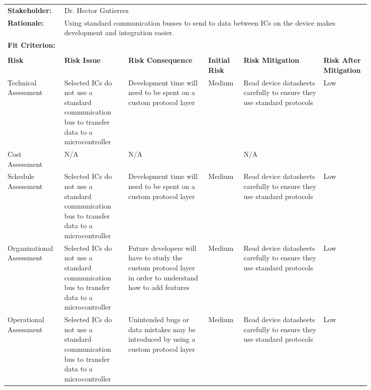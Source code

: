 \begin{landscape}
{\begin{longtable}{| p{0.12\linewidth} | p{0.16\linewidth} |  p{0.20\linewidth} | p{0.08\linewidth} | p{0.20\linewidth} | p{0.08\linewidth} |}
	\hline
	\rowcolor[gray]{0.8}
	\multicolumn{6}{|c|}{ } \\
	\hline
	\textbf{Stakeholder:} & \multicolumn{5}{|l|}{Dr. Hector Gutierrez} \\
	\hline
	\textbf{Rationale:} & \multicolumn{5}{|p{0.8\linewidth}|}{Using standard communication busses to send to data between ICs on the device makes development and integration easier.} \\
	\hline
	\textbf{Fit Criterion:} & \multicolumn{5}{|p{0.8\linewidth}|}{} \\
	\hline
	\rowcolor[gray]{0.8}
	\multicolumn{6}{|c|}{ } \\
	\hline
	\textbf{Risk} & \textbf{Risk Issue} & \textbf{Risk Consequence} & \textbf{Initial Risk} & \textbf{Risk Mitigation} & \textbf{Risk \newline After \newline Mitigation} \\
	\hline
	Technical \newline Assessment & Selected ICs do not use a standard communication bus to transfer data to a microcontroller & Development time will need to be spent on a custom protocol layer & \cellcolor{yellow} Medium & Read device datasheets carefully to ensure they use standard protocols & \cellcolor{green} Low \\
	\hline
	Cost \newline Assessment & N/A & N/A & \cellcolor[gray]{0.8} & N/A & \cellcolor[gray]{0.8} \\
	\hline
	Schedule \newline Assessment & Selected ICs do not use a standard communication bus to transfer data to a microcontroller & Development time will need to be spent on a custom protocol layer & \cellcolor{yellow} Medium & Read device datasheets carefully to ensure they use standard protocols & \cellcolor{green} Low \\
	\hline
	Organizational \newline Assessment & Selected ICs do not use a standard communication bus to transfer data to a microcontroller & Future developers will have to study the custom protocol layer in order to understand how to add features & \cellcolor{yellow} Medium & Read device datasheets carefully to ensure they use standard protocols & \cellcolor{green} Low \\
	\hline
	Operational \newline Assessment & Selected ICs do not use a standard communication bus to transfer data to a microcontroller & Unintended bugs or data mistakes may be introduced by using a custom protocol layer & \cellcolor{yellow} Medium & Read device datasheets carefully to ensure they use standard protocols & \cellcolor{green} Low
	\label{tab:sr07_feasibility}
\end{longtable}
}
\newpage



\end{landscape}
